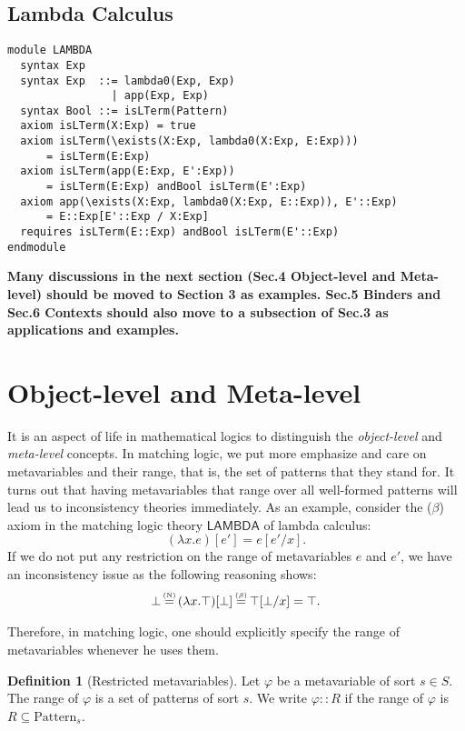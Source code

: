 \documentclass[UTF8]{article}
\newcommand{\comment}[1]
    {\par {\bfseries \color{blue} #1 \par}} %
\newcounter{thmcounter}
\theoremstyle{plain}
\theoremstyle{definition}
\newtheorem{definition}[thmcounter]{Definition}
\theoremstyle{remark}
\newcommand{\LAMBDA}{\mathsf{LAMBDA}}
\newcommand{\xeq}[1]
    {\stackrel{\mathclap{\normalfont\tiny\mbox{#1}}}{=}}
\begin{document}
\subsection{Lambda Calculus}

\begin{Verbatim}
module LAMBDA
  syntax Exp
  syntax Exp  ::= lambda0(Exp, Exp)
                | app(Exp, Exp)
  syntax Bool ::= isLTerm(Pattern)
  axiom isLTerm(X:Exp) = true
  axiom isLTerm(\exists(X:Exp, lambda0(X:Exp, E:Exp)))
      = isLTerm(E:Exp)
  axiom isLTerm(app(E:Exp, E':Exp))
      = isLTerm(E:Exp) andBool isLTerm(E':Exp)
  axiom app(\exists(X:Exp, lambda0(X:Exp, E::Exp)), E'::Exp)
      = E::Exp[E'::Exp / X:Exp]
  requires isLTerm(E::Exp) andBool isLTerm(E'::Exp)
endmodule
\end{Verbatim}

\comment{Many discussions in the next section (Sec.4 Object-level and Meta-level) should be moved to Section 3 as examples. Sec.5 Binders and Sec.6 Contexts should also move to a subsection of Sec.3 as applications and examples. }

\section{Object-level and Meta-level}

It is an aspect of life in mathematical logics to distinguish the \emph{object-level} and \emph{meta-level} concepts. In matching logic, we put more emphasize and care on metavariables and their range, that is, the set of patterns that they stand for. It turns out that having metavariables that range over all well-formed patterns will lead us to inconsistency theories immediately. As an example, consider the ($\beta$) axiom in the matching logic theory $\LAMBDA$ of lambda calculus:
\begin{equation*}
(\lambda x . e) [e'] = e[e' / x].
\end{equation*}
If we do not put any restriction on the range of metavariables $e$ and $e'$, we have an inconsistency issue as the following reasoning shows:
\begin{align*}
\bot \xeq{(N)} (\lambda x . \top)[\bot] \xeq{($\beta$)} \top[\bot / x] = \top.
\end{align*}

Therefore, in matching logic, one should explicitly specify the range of metavariables whenever he uses them.

\begin{definition}[Restricted metavariables]
	Let $\varphi$ be a metavariable of sort $s \in S$. The range of $\varphi$ is a set of patterns of sort $s$. We write $\varphi :: R$ if the range of $\varphi$ is $R \subseteq \mathrm{Pattern}_s$.
\end{definition}
\end{document}
